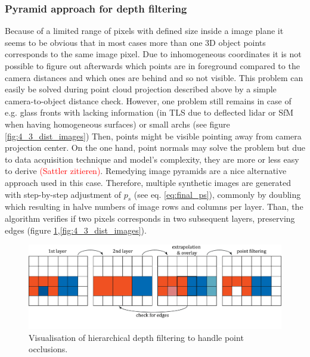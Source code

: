 \documentclass[review]{elsarticle}
\begin{document}
\subsubsection{Pyramid approach for depth filtering}
Because of a limited range of pixels with defined size inside a image plane it seems to be obvious that in most cases more than one 3D object points corresponds to the same image pixel. Due to inhomogeneous coordinates it is not possible to figure out afterwards which points are in foreground compared to the camera distances and which ones are behind and so not visible. This problem can easily be solved during point cloud projection described above by a simple camera-to-object distance check. However, one problem still remains in case of e.g. glass fronts with lacking information (in \gls{TLS} due to deflected lidar or \gls{SfM} when having homogeneous surfaces) or small archs (see figure \ref{fig:4_3_dist_images}) Then, points might be visible pointing away from camera projection center. On the one hand, point normals may solve the problem but due to data acquisition technique and model's complexity, they are more or less easy to derive \textcolor{red}{(Sattler zitieren)}. 
Remedying image pyramids are a nice alternative approach used in this case. Therefore, multiple synthetic images are generated with step-by-step adjustment of $p_s$ (see eq. \ref{eq:final_ps}), commonly by doubling which resulting in halve numbers of image rows and columns per layer. Than, the algorithm verifies if two pixels corresponds in two subsequent layers, preserving edges (figure \ref{fig:4_3_point_filtering},\ref{fig:4_3_dist_images}).
\begin{figure}[h]
\centering
\includegraphics[width=12cm]{graphics/4_3_point_filtering}
\caption{Visualisation of hierarchical depth filtering to handle point occlusions.}
\label{fig:4_3_point_filtering}
\end{figure}
\end{document}

